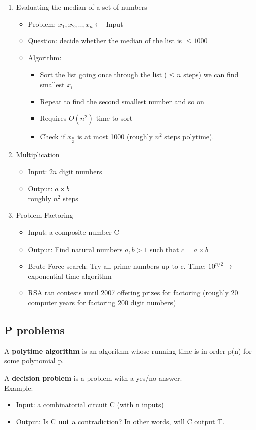 \documentclass[9pt, letterpaper, oneside]{article}
\begin{document}
\begin{enumerate}
	\item Evaluating the median of a set of numbers
	\begin{itemize}
		\item Problem: $x_1, x_2, .., x_n \leftarrow$ Input
		\item Question: decide whether the median of the list is $\leq 1000$
		\item Algorithm: 
		\begin{itemize}
			\item Sort the list going once through the list ($\leq n$ steps) we can find smallest $x_i$
			\item Repeat to find the second smallest number and so on
			\item Requires $O(n^2)$ time to sort
			\item Check if $x_{\frac{n}{2}}$ is at most 1000 (roughly $n^2$ steps polytime).
		\end{itemize}
	\end{itemize}
	\item Multiplication
		\begin{itemize}
			\item Input: $2 n$ digit numbers
			\item Output: $a \times b$
			\\ roughly $n^2$ steps
		\end{itemize}
	\item Problem Factoring
		\begin{itemize}
			\item Input: a composite number C
			\item Output: Find natural numbers $a, b > 1$ such that $c = a \times b$
			\item Brute-Force search: Try all prime numbers up to c. Time: $10^{n/2} \to$ exponential time algorithm
			\item RSA ran contests until 2007 offering prizes for factoring (roughly 20 computer years for factoring 200 digit numbers)
		\end{itemize}
\end{enumerate}

\subsection{P problems}
A \textbf{polytime algorithm} is an algorithm whose running time is in order p(n) for some polynomial p.

A \textbf{decision problem} is a problem with a yes/no answer.\\
Example: 
	\begin{itemize}
	\item Input: a combinatorial circuit C (with n inputs)
	\item Output: Is C \textbf{not} a contradiction? In other words, will C output T.
	\end{itemize}
\end{document}
